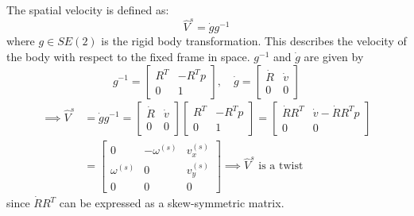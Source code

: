 The spatial velocity is defined as:
\[
    \hat{V}^{s} = \dot{g} g^{-1}
\]
where \( g \in SE(2) \) is the rigid body transformation.
This describes the velocity of the body with respect to the fixed frame in space.
\( g^{-1} \) and \( \dot g \) are given by
\begin{equation*}
    g^{-1} = \begin{bmatrix}
        R^T & -R^T p \\
        0   & 1
    \end{bmatrix},
    \quad
    \dot{g} = \begin{bmatrix}
        \dot R & \dot v \\
        0      & 0
    \end{bmatrix}
\end{equation*}
\begin{align*}
    \implies
    \hat{V}^{s}
     & =
    \dot{g} g^{-1}
    =
    \begin{bmatrix}
        \dot R & \dot v \\
        0      & 0
    \end{bmatrix}
    \begin{bmatrix}
        R^T & -R^T p \\
        0   & 1
    \end{bmatrix}
    =
    \begin{bmatrix}
        \dot R R^T & \dot v - \dot R R^T p \\
        0          & 0
    \end{bmatrix}
    \\ & =
    \begin{bmatrix}
        0            & -\omega^{(s)} & v_x^{(s)} \\
        \omega^{(s)} & 0             & v_y^{(s)} \\
        0            & 0             & 0
    \end{bmatrix}
    \implies
    \hat{V}^{s} \text{ is a twist}
\end{align*}
since \( \dot R R^T \) can be expressed as a skew-symmetric matrix.

